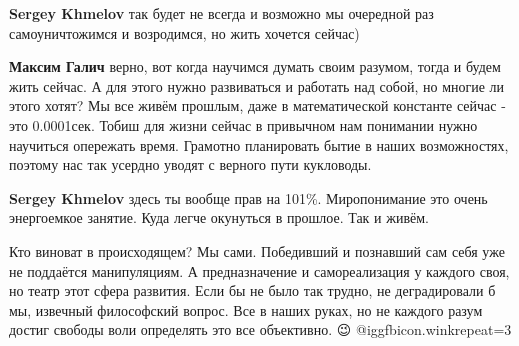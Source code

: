  
\textbf{Sergey Khmelov} так будет не всегда и возможно мы очередной раз самоуничтожимся и возродимся, но жить хочется сейчас)

 
\textbf{Максим Галич} верно, вот когда научимся думать своим разумом, тогда и будем жить сейчас. А для этого нужно развиваться и работать над собой, но многие ли этого хотят? Мы все живём прошлым, даже в математической константе сейчас - это 0.0001сек. Тобиш для жизни сейчас в привычном нам понимании нужно научиться опережать время. Грамотно планировать бытие в наших возможностях, поэтому нас так усердно уводят с верного пути кукловоды.

 
\textbf{Sergey Khmelov} здесь ты вообще прав на 101\%. Миропонимание это очень энергоемкое занятие. Куда легче окунуться в прошлое. Так и живём.

 

Кто виноват в происходящем? Мы сами. Победивший и познавший сам себя уже не
поддаётся манипуляциям. А предназначение и самореализация у каждого своя, но
театр этот сфера развития. Если бы не было так трудно, не деградировали б мы,
извечный философский вопрос. Все в наших руках, но не каждого разум достиг
свободы воли определять это все объективно. 😉 @igg{fbicon.wink}{repeat=3}

 
